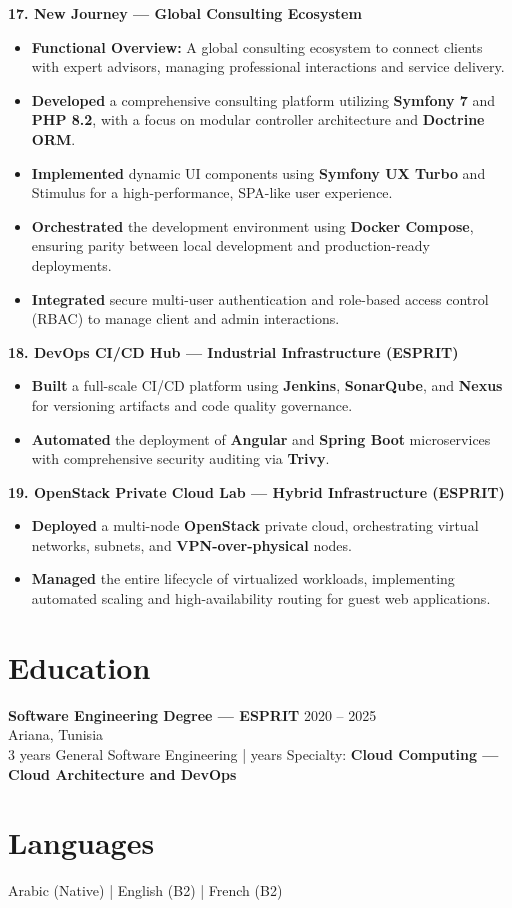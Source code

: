 \documentclass[10pt, letterpaper]{article}
\newenvironment{highlights}{
\begin{itemize}[leftmargin=12pt, itemsep=2pt]
}{
\end{itemize}
}
\begin{document}
\textbf{17. New Journey --- Global Consulting Ecosystem}
\begin{highlights}
\item \textbf{Functional Overview:} A global consulting ecosystem to connect clients with expert advisors, managing professional interactions and service delivery.
\item \textbf{Developed} a comprehensive consulting platform utilizing \textbf{Symfony 7} and \textbf{PHP 8.2}, with a focus on modular controller architecture and \textbf{Doctrine ORM}.
\item \textbf{Implemented} dynamic UI components using \textbf{Symfony UX Turbo} and Stimulus for a high-performance, SPA-like user experience.
\item \textbf{Orchestrated} the development environment using \textbf{Docker Compose}, ensuring parity between local development and production-ready deployments.
\item \textbf{Integrated} secure multi-user authentication and role-based access control (RBAC) to manage client and admin interactions.
\end{highlights}

\textbf{18. DevOps CI/CD Hub --- Industrial Infrastructure (ESPRIT)}
\begin{highlights}
\item \textbf{Built} a full-scale CI/CD platform using \textbf{Jenkins}, \textbf{SonarQube}, and \textbf{Nexus} for versioning artifacts and code quality governance.
\item \textbf{Automated} the deployment of \textbf{Angular} and \textbf{Spring Boot} microservices with comprehensive security auditing via \textbf{Trivy}.
\end{highlights}

\textbf{19. OpenStack Private Cloud Lab --- Hybrid Infrastructure (ESPRIT)}
\begin{highlights}
\item \textbf{Deployed} a multi-node \textbf{OpenStack} private cloud, orchestrating virtual networks, subnets, and \textbf{VPN-over-physical} nodes.
\item \textbf{Managed} the entire lifecycle of virtualized workloads, implementing automated scaling and high-availability routing for guest web applications.
\end{highlights}

\section{Education}
\textbf{Software Engineering Degree --- ESPRIT} \hfill 2020 -- 2025 \\
Ariana, Tunisia \\
3 years General Software Engineering \;| years Specialty: \textbf{Cloud Computing --- Cloud Architecture and DevOps}

\section{Languages}
Arabic (Native) \;|\; English (B2) \;|\; French (B2)
\end{document}
